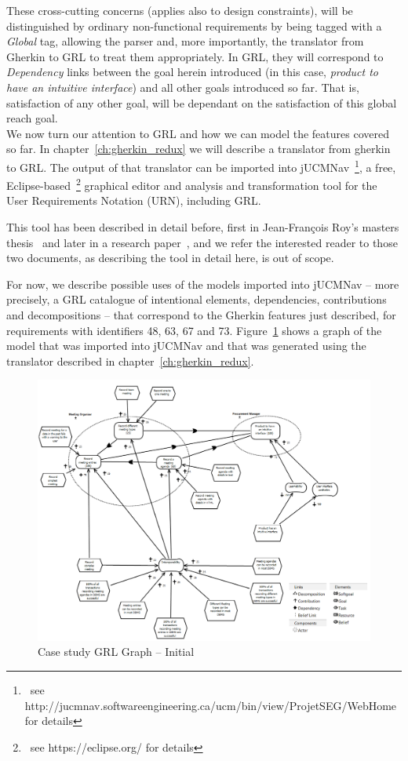 \documentclass[dissertation,final]{softeng}
\newcommand{\nfrs}{non-functional requirements\xspace}
\begin{document}
These cross-cutting concerns (applies also to design constraints), will be distinguished by ordinary \nfrs by being tagged with a \emph{Global} tag, allowing the parser and, more importantly, the translator from Gherkin to GRL to treat them appropriately. In GRL, they will correspond to \emph{Dependency} links between the goal herein introduced (in this case, \emph{product to have an intuitive interface}) and all other goals introduced so far. That is, satisfaction of any other goal, will be dependant on the satisfaction of this global reach goal.\\

We now turn our attention to GRL and how we can model the features covered so far. In chapter~\ref{ch:gherkin_redux} we will describe a translator from gherkin to GRL. The output of that translator can be imported into jUCMNav~\footnote{~see http://jucmnav.softwareengineering.ca/ucm/bin/view/ProjetSEG/WebHome for details}, a free, Eclipse-based~\footnote{~see https://eclipse.org/ for details} graphical editor and analysis and transformation tool for the User Requirements Notation (URN), including GRL.

This tool has been described in detail before, first in Jean-François Roy's masters thesis~\citep{Roy:2007wyba} and later in a research paper~\citep{Amyot2010}, and we refer the interested reader to those two documents, as describing the tool in detail here, is out of scope.

For now, we describe possible uses of the models imported into jUCMNav -- more precisely, a GRL catalogue of intentional elements, dependencies, contributions and decompositions -- that correspond to the Gherkin features just described, for requirements with identifiers 48, 63, 67 and 73. Figure~\ref{fig:InitialGRLGraph} shows a graph of the model that was imported into jUCMNav and that was generated using the translator described in chapter~\ref{ch:gherkin_redux}.

\begin{figure}
\includegraphics[width=\columnwidth]{casestudy-initial}
\centering
\caption{Case study GRL Graph -- Initial}
\label{fig:InitialGRLGraph}
\end{figure}
\end{document}
